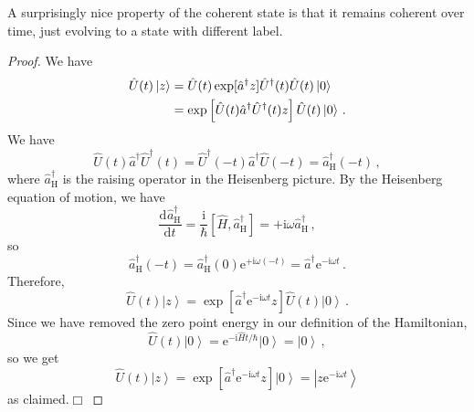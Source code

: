 \documentclass{article}
\theoremstyle{plain}\theoremheaderfont{\normalfont\itshape}\theorembodyfont{\rmfamily}\theoremseparator{.}\newtheorem*{rem}{Remark}\newtheorem*{ex}{Example}\newtheorem*{proof}{Proof}\newtheorem*{altp}{Alternative proof}
\theoremstyle{plain}\theoremheaderfont{\normalfont\bfseries}\theorembodyfont{\rmfamily}\theoremseparator{.}\newtheorem{thm}{Theorem}[section]\newtheorem{lem}[thm]{Lemma}\newtheorem{prop}[thm]{Proposition}\newtheorem*{cor}{Corollary}\newtheorem{defn}[thm]{Definition}\newtheorem{clm}[thm]{Claim}\newtheorem{clminproof}{Claim}
\theoremstyle{break}\theoremheaderfont{\normalfont\itshape}\theorembodyfont{\rmfamily}\theoremseparator{.\medskip}\newtheorem*{proofskip}{Proof}\newtheorem*{exs}{Examples}\newtheorem*{rems}{Remarks}
\theoremstyle{break}\theoremheaderfont{\normalfont\bfseries}\theorembodyfont{\rmfamily}\theoremseparator{.\medskip}\newtheorem{lemskip}[thm]{Lemma}\newtheorem{defnskip}[thm]{Definition}\newtheorem{propskip}[thm]{Proposition}\newtheorem{thmskip}[thm]{Theorem}
\numberwithin{equation}{section}
\newcommand{\qed}{\hfill\ensuremath{\Box}}
\newcommand{\ii}{\mathrm{i}}
\newcommand{\ee}{\mathrm{e}}
\newcommand{\dv}[3][]{\frac{\mathrm{d}^{#1} #2}{{\mathrm{d} #3}^{#1}}}
\newcommand{\ket}[1]{\left| #1 \right\rangle}
\newcommand{\rai}{\hat{a}^\dagger}
\begin{document}
    A surprisingly nice property of the coherent state is that it remains coherent over time, just evolving to a state with different label.
    \begin{proof}
        We have
        \begin{align}
            \hat{U}(t)\ket{z}&=\hat{U}(t)\exp[\rai z]\hat{U}^\dagger(t)\hat{U}(t)\ket{0}\notag \\
            &=\exp\left[\hat{U}(t)\rai\hat{U}^\dagger(t) z\right]\hat{U}(t)\ket{0}\,.
        \end{align}
        We have
        \begin{equation}
            \hat{U}(t)\rai\hat{U}^\dagger(t)=\hat{U}^\dagger(-t)\rai\hat{U}(-t)=\rai_{\text{H}}(-t)\,,
        \end{equation}
        where \(\rai_{\text{H}}\) is the raising operator in the Heisenberg picture. By the Heisenberg equation of motion, we have
        \begin{equation}
            \dv{\rai_{\text{H}}}{t}=\frac{\ii}{\hbar}[\hat{H},\rai_{\text{H}}]=+\ii\omega\rai_{\text{H}}\,,
        \end{equation}
        so
        \begin{equation}
            \rai_{\text{H}}(-t)=\rai_{\text{H}}(0)\ee^{+\ii\omega(-t)}=\rai\ee^{-\ii\omega t}\,.
        \end{equation}
        Therefore,
        \begin{equation}
            \hat{U}(t)\ket{z}=\exp[\rai\ee^{-\ii\omega t}z]\hat{U}(t)\ket{0}\,.
        \end{equation}
        Since we have removed the zero point energy in our definition of the Hamiltonian,
        \begin{equation}
            \hat{U}(t)\ket{0}=\ee^{-\ii\hat{H}t/\hbar}\ket{0}=\ket{0}\,,
        \end{equation}
        so we get
        \begin{equation}
            \hat{U}(t)\ket{z}=\exp[\rai \ee^{-\ii\omega t}z]\ket{0}=\ket{z\ee^{-\ii\omega t}}
        \end{equation}
        as claimed.\qed
    \end{proof}
\end{document}
